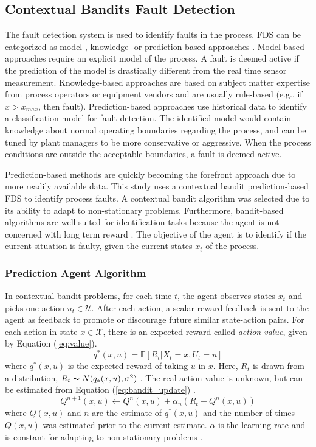 \subsection{Contextual Bandits Fault Detection}
The fault detection system is used to identify faults in the process.  FDS can be categorized as model-, knowledge- or prediction-based approaches \cite{ftcs_diagnosis_ref7}. Model-based approaches require an explicit model of the process.  A fault is deemed active if the prediction of the model is drastically different from the real time sensor measurement.  Knowledge-based approaches are based on subject matter expertise from process operators or equipment vendors and are usually rule-based (e.g., if $x > x_{max}$, then fault). Prediction-based approaches use historical data to identify a classification model for fault detection. The identified model would contain knowledge about normal operating boundaries regarding the process, and can be tuned by plant managers to be more conservative or aggressive. When the process conditions are outside the acceptable boundaries, a fault is deemed active. 

Prediction-based methods are quickly becoming the forefront approach due to more readily available data. This study uses a contextual bandit prediction-based FDS to identify process faults. A contextual bandit algorithm was selected due to its ability to adapt to non-stationary problems.  Furthermore, bandit-based algorithms are well suited for identification tasks because the agent is not concerned with long term reward \cite{sutton}. The objective of the agent is to identify if the current situation is faulty, given the current states $x_t$ of the process. 

\subsubsection{Prediction Agent Algorithm}

In contextual bandit problems, for each time $t$, the agent observes states $x_t$ and picks one action $u_t \in \mathcal{U}$.  After each action, a scalar reward feedback is sent to the agent as feedback to promote or discourage future similar state-action pairs.  For each action in state $x \in \mathcal{X}$, there is an expected reward called \textit{action-value}, given by Equation (\ref{eq:value}).
\begin{equation}
    q^*(x, u) = {\mathbb{E}} [R_t | X_t = x, U_t = u]
    \label{eq:value}
\end{equation}
where $q^*(x, u)$ is the expected reward of taking $u$ in $x$. Here, $R_t$ is drawn from a distribution, $R_t \thicksim N(q_*(x, u), \sigma^2)$ \cite{sutton}. The real action-value is unknown, but can be estimated from Equation (\ref{eq:bandit_update}) \cite{bandits_ref9}.
\begin{equation}
    Q^{n+1}(x, u) \leftarrow Q^n(x, u) + \alpha_n (R_t - Q^n(x, u))
    \label{eq:bandit_update}
\end{equation}
where $Q(x, u)$ and $n$ are the estimate of $q^*(x, u)$ and the number of times $Q(x, u)$ was estimated prior to the current estimate.  $\alpha$ is the learning rate and is constant for adapting to non-stationary problems \cite{sutton}.  

